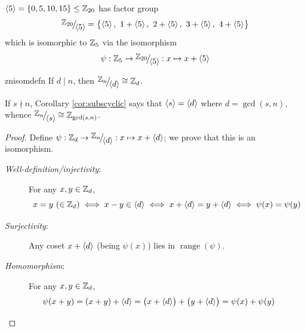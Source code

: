 \begin{example}{}{}
	$\left\langle 5\right\rangle=\{0,5,10,15\}\le\mathbb{Z}_{20}$ has factor group
	\[
		\quotient{\Z_{20}}{\ip 5}=\bigl\{\ip 5,\ 1+\ip 5,\ 2+\ip 5,\ 3+\ip 5,\ 4+\ip 5\bigr\}
	\]
	which is isomorphic to $\mathbb{Z}_5$ via the isomorphism
	\[
		\psi:\Z_5\to\quotient{\Z_{20}}{\ip 5}:x\mapsto x+\ip 5
	\]
\end{example}


\begin{thm}{}{znisomdefn}
	If $d\mid n$, then $\quotient{\Z_n}{\ip d}\cong\Z_d$.
\end{thm}

If $s\nmid n$, Corollary \ref{cor:subscyclic} says that $\left\langle s\right\rangle=\left\langle d\right\rangle$ where $d=\gcd(s,n)$, whence $\quotient{\Z_n}{\ip s}\cong\Z_{\gcd(s,n)}$.

\begin{proof}
	Define $\smash[b]{\psi:\Z_d\to\quotient{\Z_n}{\ip d}:x\mapsto x+\ip d}$; we prove that this is an isomorphism.
	\begin{description}%
		\item[\normalfont\emph{Well-definition/injectivity}:\footnotemark] For any $x,y\in\mathbb{Z}_d$,
		\[
			x=y\ (\in\mathbb{Z}_d)\iff x-y\in\left\langle d\right\rangle\iff x+\left\langle d\right\rangle=y+\left\langle d\right\rangle\iff \psi(x)=\psi(y)
		\]\vspace{-20pt}
		\item[\normalfont\emph{Surjectivity}:] Any coset $x+\left\langle d\right\rangle$ (being $\psi(x)$) lies in $\operatorname{range}(\psi)$.	
		\item[\normalfont\emph{Homomorphism}:] For any $x,y\in\mathbb{Z}_d$,
		\[\psi(x+y)=(x+y)+\left\langle d\right\rangle=\bigl(x+\left\langle d\right\rangle\bigr)+\bigl(y+\left\langle d\right\rangle\bigr)=\psi(x)+\psi(y)\tag*{\qedhere}\]
	\end{description}
\end{proof}



